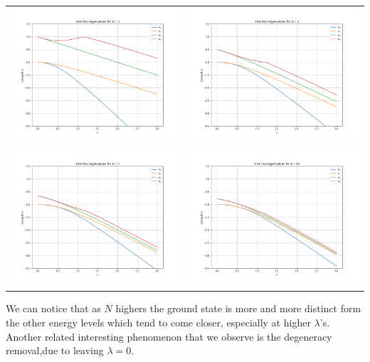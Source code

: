 \documentclass{article}
\begin{document}
\begin{flushleft}
\begin{tabular}{ll}
	\includegraphics[width=0.65\linewidth,clip, trim={1.5cm 0 1.5cm 0}]{images/eigenvalues3.png} & 
	\includegraphics[width=0.65\linewidth,clip, trim={1.5cm 0 1.5cm 0}]{images/eigenvalues5.png} \\
	\includegraphics[width=0.65\linewidth,clip, trim={1.5cm 0 1.5cm 0}]{images/eigenvalues7.png} &
	\includegraphics[width=0.65\linewidth,clip, trim={1.5cm 0 1.5cm 0}]{images/eigenvalues10.png}
\end{tabular}
\end{flushleft}
We can notice that as $N$ highers the ground state is more and more distinct form the other energy levels which tend to come closer, especially at higher $\lambda$'s.
Another related interesting phenomenon that we observe is the degeneracy removal,due to leaving $\lambda=0$.
\end{document}
